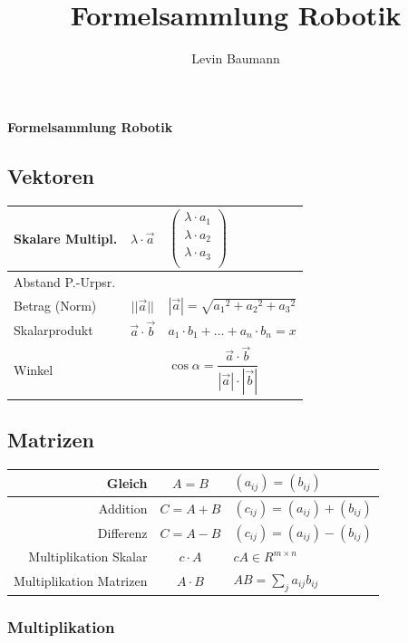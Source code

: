 \documentclass[8pt,a4paper,landscape]{scrartcl}
\author{Levin Baumann}
\title{Formelsammlung Robotik}
\renewcommand{\arraystretch}{1.25}
\begin{document}
 
\setlength{\columnsep}{1cm} 
\begin{multicols*}{3}
{\LARGE\bfseries Formelsammlung Robotik }

\subsection*{Vektoren}
\renewcommand{\arraystretch}{1}
\begin{tabularx}{\columnwidth}{l|c|X}
	Skalare Multipl. & $ \lambda \cdot \vec{a}$ & 
	$\left(\begin{array}{rrr}                       \lambda \cdot a_1\\
	\lambda \cdot a_2\\
	\lambda \cdot a_3\\                 
	\end{array}\right)$\\ \hline
	Abstand P.-Urpsr. & \\
	Betrag (Norm) & $ ||\vec{a}||$ & 
	$|\vec{a}| = \sqrt{{a_1}^2 + {a_2}^2 + {a_3}^2}$\\ \hline
	Skalarprodukt & $\vec{a}\cdot\vec{b}$ & $a_1 \cdot b_1 + \ldots + a_n \cdot b_n = x$ \\ \hline
	Winkel &  & $\cos \alpha = \dfrac{\vec{a} \cdot \vec{b}}{|\vec{a}| \cdot |\vec{b}|}$ \\ \hline
\end{tabularx}

\subsection*{Matrizen}
\begin{tabularx}{\columnwidth}{r|c|X}
	Gleich & $ A = B $ & $ \left(a_{ij}\right) = \left(b_{ij}\right)$ \\ \hline
	Addition & $ C = A + B $ & $ \left(c_{ij}\right) = \left(a_{ij}\right) + \left(b_{ij}\right) $ \\ \hline
	Differenz & $ C = A - B $ &  $ \left(c_{ij}\right) = \left(a_{ij}\right) - \left(b_{ij}\right) $ \\ \hline
	Multiplikation Skalar & $ c \cdot A $ & $ cA \in R^{m \times n} $ \\ \hline
	Multiplikation Matrizen & $ A \cdot B $ & $ AB = \sum_{j} a_{ij}b_{ij} $
\end{tabularx}

\subsubsection*{Multiplikation}


\end{multicols*}
\end{document}
